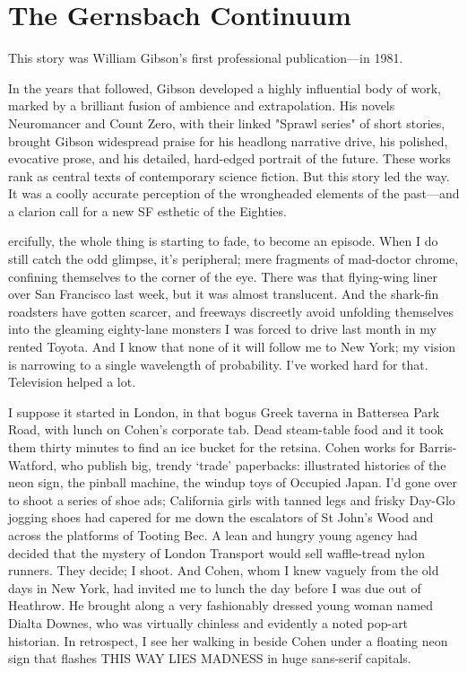 \chapter{The Gernsbach Continuum}

This story was William Gibson's first professional publication---in 1981.

In the years that followed, Gibson developed a highly influential body of work, marked by a brilliant fusion of ambience and extrapolation. His novels Neuromancer and Count Zero, with their linked "Sprawl series" of short stories, brought Gibson widespread praise for his headlong narrative drive, his polished, evocative prose, and his detailed, hard-edged portrait of the future. These works rank as central texts of contemporary science fiction.
But this story led the way. It was a coolly accurate perception of the wrongheaded elements of the past—and a clarion call for a new SF esthetic of the Eighties.

\hrulefill

ercifully, the whole thing is starting to fade, to become an episode. When I do still catch the odd glimpse, it's peripheral; mere fragments of mad-doctor chrome, confining themselves to the corner of the eye. There was that flying-wing liner over San Francisco last week, but it was almost translucent. And the shark-fin roadsters have gotten scarcer, and freeways discreetly avoid unfolding themselves into the gleaming eighty-lane monsters I was forced to drive last month in my rented Toyota. And I know that none of it will follow me to New York; my vision is narrowing to a single wavelength of probability. I've worked hard for that. Television helped a lot.

I suppose it started in London, in that bogus Greek taverna in Battersea Park Road, with lunch on Cohen's corporate tab. Dead steam-table food and it took them thirty minutes to find an ice bucket for the retsina. Cohen works for Barris-Watford, who publish big, trendy `trade' paperbacks: illustrated histories of the neon sign, the pinball machine, the windup toys of Occupied Japan. I'd gone over to shoot a series of shoe ads; California girls with tanned legs and frisky Day-Glo jogging shoes had capered for me down the escalators of St John's Wood and across the platforms of Tooting Bec. A lean and hungry young agency had decided that the mystery of London Transport would sell waffle-tread nylon runners. They decide; I shoot. And Cohen, whom I knew vaguely from the old days in New York, had invited me to lunch the day before I was due out of Heathrow. He brought along a very fashionably dressed young woman named Dialta Downes, who was virtually chinless and evidently a noted pop-art historian. In retrospect, I see her walking in beside Cohen under a floating neon sign that flashes THIS WAY LIES MADNESS in huge sans-serif capitals.


